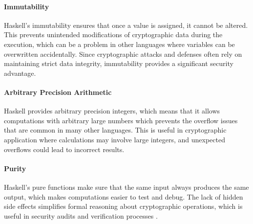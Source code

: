 \paragraph{Immutability}
Haskell's immutability ensures that once a value is assigned, it cannot be altered. This prevents unintended modifications of  cryptographic data during the execution, which can be a problem in other languages where variables can be overwritten accidentally. Since cryptographic attacks and defenses often rely on maintaining strict data integrity, immutability provides a significant security advantage.

\paragraph{Arbitrary Precision Arithmetic}
Haskell provides arbitrary precision integers, which means that it allows computations with arbitrary large numbers which prevents the overflow issues that are common in many other languages. This is useful in cryptographic application where calculations may involve large integers, and unexpected overflows could lead to incorrect results.

\paragraph{Purity}
Haskell's pure functions make sure that the same input always produces the same output, which makes computations easier to test and debug. The lack of hidden side effects simplifies formal reasoning about cryptographic operations, which is useful in security audits and verification processes \cite{Hughes1989}.

